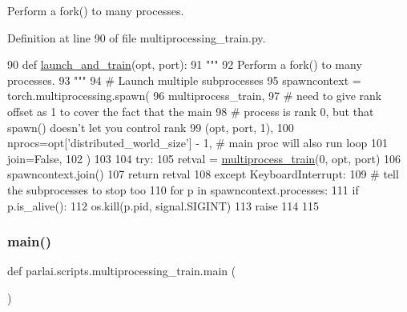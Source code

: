 \begin{DoxyVerb}Perform a fork() to many processes.
\end{DoxyVerb}
 

Definition at line 90 of file multiprocessing\+\_\+train.\+py.


\begin{DoxyCode}
90 \textcolor{keyword}{def }\hyperlink{namespaceparlai_1_1scripts_1_1multiprocessing__train_a5dc8df166f1c025b54f7420a1ab2f812}{launch\_and\_train}(opt, port):
91     \textcolor{stringliteral}{"""}
92 \textcolor{stringliteral}{    Perform a fork() to many processes.}
93 \textcolor{stringliteral}{    """}
94     \textcolor{comment}{# Launch multiple subprocesses}
95     spawncontext = torch.multiprocessing.spawn(
96         multiprocess\_train,
97         \textcolor{comment}{# need to give rank offset as 1 to cover the fact that the main}
98         \textcolor{comment}{# process is rank 0, but that spawn() doesn't let you control rank}
99         (opt, port, 1),
100         nprocs=opt[\textcolor{stringliteral}{'distributed\_world\_size'}] - 1,  \textcolor{comment}{# main proc will also run loop}
101         join=\textcolor{keyword}{False},
102     )
103 
104     \textcolor{keywordflow}{try}:
105         retval = \hyperlink{namespaceparlai_1_1scripts_1_1multiprocessing__train_aa979267c9eb44bbdfcd25a6d69a58cc4}{multiprocess\_train}(0, opt, port)
106         spawncontext.join()
107         \textcolor{keywordflow}{return} retval
108     \textcolor{keywordflow}{except} KeyboardInterrupt:
109         \textcolor{comment}{# tell the subprocesses to stop too}
110         \textcolor{keywordflow}{for} p \textcolor{keywordflow}{in} spawncontext.processes:
111             \textcolor{keywordflow}{if} p.is\_alive():
112                 os.kill(p.pid, signal.SIGINT)
113         \textcolor{keywordflow}{raise}
114 
115 
\end{DoxyCode}
\mbox{\label{namespaceparlai_1_1scripts_1_1multiprocessing__train_aa7b2a133561ac5212f3ee9814a645522}} 
\subsubsection{\texorpdfstring{main()}{main()}}
{\footnotesize\ttfamily def parlai.\+scripts.\+multiprocessing\+\_\+train.\+main (\begin{DoxyParamCaption}{ }\end{DoxyParamCaption})}



